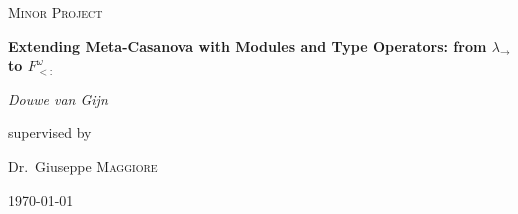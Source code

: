 \documentclass[12pt,a4paper]{report}
\begin{document}
\begin{titlepage}
	\centering
	\vspace{1cm}
	{\scshape\Large Minor Project\par}
	\vspace{1.5cm}
	       {\huge\bfseries Extending Meta-Casanova with Modules and Type Operators: from $\lambda_→$ to $F^\omega_{<:}$\par}
	\vspace{2cm}
	{\Large\itshape Douwe van Gijn\par}
	\vfill
	supervised by\par
	Dr.~Giuseppe \textsc{Maggiore}
	\vfill
	{\large \today\par}
\end{titlepage}
\end{document}
